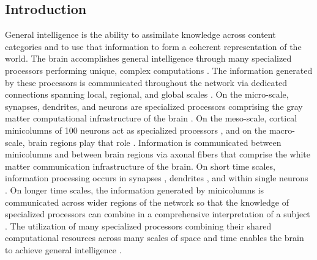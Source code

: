 \documentclass{article}
\begin{document}
\begin{multicols}{2}

\section{\label{sec:introduction}Introduction}
General intelligence is the ability to assimilate knowledge across content categories and to use that information to form a coherent representation of the world. The brain accomplishes general intelligence through many specialized processors performing unique, complex computations \cite{ba1988,de2014}. The information generated by these processors is communicated throughout the network via dedicated connections spanning local, regional, and global scales \cite{sp2010}. On the micro-scale, synapses, dendrites, and neurons are specialized processors comprising the gray matter computational infrastructure of the brain \cite{geki2002}. On the meso-scale, cortical minicolumns of 100 neurons act as specialized processors \cite{mo1997}, and on the macro-scale, brain regions play that role \cite{brme2010}. Information is communicated between minicolumns and between brain regions via axonal fibers that comprise the white matter communication infrastructure of the brain. On short time scales, information processing occurs in synapses \cite{abre2004}, dendrites \cite{stsp2015}, and within single neurons \cite{ko1997}. On longer time scales, the information generated by minicolumns is communicated across wider regions of the network so that the knowledge of specialized processors can combine in a comprehensive interpretation of a subject \cite{bu2006}. The utilization of many specialized processors combining their shared computational resources across many scales of space and time enables the brain to achieve general intelligence \cite{ba1988,de2014}. 


\end{multicols}
\end{document}

